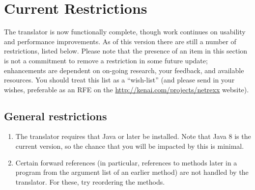 \chapter{Current Restrictions}\label{restrictions}
The \nr{} translator is now functionally complete, though work continues on usability and performance improvements. As of this version there are still a number of restrictions, listed below. 
Please note that the presence of an item in this section is not a commitment to remove a restriction in some future update; \nr{} enhancements are dependent on on-going research, your feedback, and available resources. You should treat this list as a “wish-list” (and please send in your wishes, preferable as an RFE on the \url{http://kenai.com/projects/netrexx} website). 
\section{General restrictions}
\begin{enumerate}
\item The translator requires that Java  \minimalJVMversion{} or later be installed. Note that Java 8 is the current version, so the chance that you will be impacted by this is minimal. 
\item Certain forward references (in particular, references to methods later in a program from the argument list of an earlier method) are not handled by the translator. For these, try reordering the methods.
\end{enumerate}
